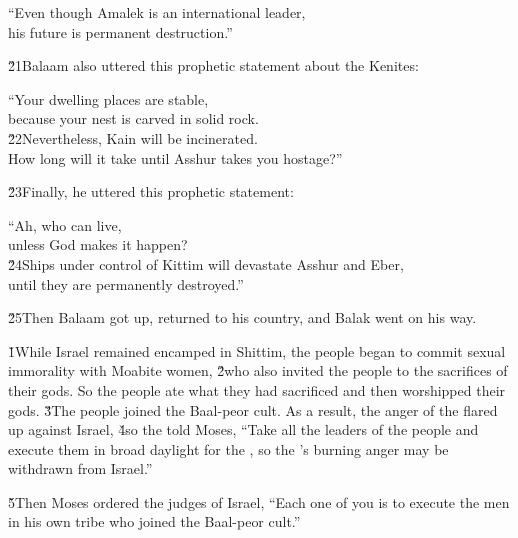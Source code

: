\begin{poetry}
\poeml ``Even though Amalek is an international leader, \\
\poemll    his future is permanent destruction.''
\end{poetry}

\v{21}Balaam also uttered this prophetic statement about the Kenites:

\begin{poetry}
\poeml ``Your dwelling places are stable, \\
\poemll    because your nest is carved in solid rock. \\
\poeml \v{22}Nevertheless, Kain will be incinerated. \\
\poemll    How long will it take until Asshur takes you hostage?''
\end{poetry}

\v{23}Finally, he uttered this prophetic statement:

\begin{poetry}
\poeml ``Ah, who can live, \\
\poemll    unless God makes it happen? \\
\poeml \v{24}Ships under control of Kittim will devastate Asshur and Eber, \\
\poemll    until they are permanently destroyed.''
\end{poetry}

\v{25}Then Balaam got up, returned to his country, and Balak went on his way.

\v{1}While Israel remained encamped in Shittim, the people began to commit sexual immorality with Moabite women, \v{2}who also invited the people to the sacrifices of their gods. So the people ate what they had sacrificed and then worshipped their gods. \v{3}The people joined the Baal-peor cult. As a result, the anger of the  flared up against Israel, \v{4}so the  told Moses, ``Take all the leaders of the people and execute them in broad daylight for the , so the 's burning anger may be withdrawn from Israel.''

\v{5}Then Moses ordered the judges of Israel, ``Each one of you is to execute the men in his own tribe who joined the Baal-peor cult.''

